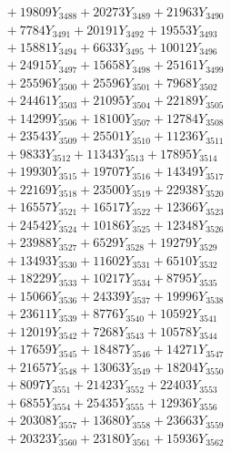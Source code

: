 \documentclass[a4paper,10pt]{article}
\begin{document}
{\begin{align}
&\;  + 19809 Y_{3488} + 20273 Y_{3489} + 21963 Y_{3490} \\[0.3ex]
&\;  + 7784 Y_{3491} + 20191 Y_{3492} + 19553 Y_{3493} \\[0.3ex]
&\;  + 15881 Y_{3494} + 6633 Y_{3495} + 10012 Y_{3496} \\[0.3ex]
&\;  + 24915 Y_{3497} + 15658 Y_{3498} + 25161 Y_{3499} \\[0.3ex]
&\;  + 25596 Y_{3500} + 25596 Y_{3501} + 7968 Y_{3502} \\[0.3ex]
&\;  + 24461 Y_{3503} + 21095 Y_{3504} + 22189 Y_{3505} \\[0.3ex]
&\;  + 14299 Y_{3506} + 18100 Y_{3507} + 12784 Y_{3508} \\[0.5ex]\allowbreak
&\;  + 23543 Y_{3509} + 25501 Y_{3510} + 11236 Y_{3511} \\[0.3ex]
&\;  + 9833 Y_{3512} + 11343 Y_{3513} + 17895 Y_{3514} \\[0.3ex]
&\;  + 19930 Y_{3515} + 19707 Y_{3516} + 14349 Y_{3517} \\[0.3ex]
&\;  + 22169 Y_{3518} + 23500 Y_{3519} + 22938 Y_{3520} \\[0.3ex]
&\;  + 16557 Y_{3521} + 16517 Y_{3522} + 12366 Y_{3523} \\[0.3ex]
&\;  + 24542 Y_{3524} + 10186 Y_{3525} + 12348 Y_{3526} \\[0.3ex]
&\;  + 23988 Y_{3527} + 6529 Y_{3528} + 19279 Y_{3529} \\[0.3ex]
&\;  + 13493 Y_{3530} + 11602 Y_{3531} + 6510 Y_{3532} \\[0.3ex]
&\;  + 18229 Y_{3533} + 10217 Y_{3534} + 8795 Y_{3535} \\[0.3ex]
&\;  + 15066 Y_{3536} + 24339 Y_{3537} + 19996 Y_{3538} \\[0.5ex]\allowbreak
&\;  + 23611 Y_{3539} + 8776 Y_{3540} + 10592 Y_{3541} \\[0.3ex]
&\;  + 12019 Y_{3542} + 7268 Y_{3543} + 10578 Y_{3544} \\[0.3ex]
&\;  + 17659 Y_{3545} + 18487 Y_{3546} + 14271 Y_{3547} \\[0.3ex]
&\;  + 21657 Y_{3548} + 13063 Y_{3549} + 18204 Y_{3550} \\[0.3ex]
&\;  + 8097 Y_{3551} + 21423 Y_{3552} + 22403 Y_{3553} \\[0.3ex]
&\;  + 6855 Y_{3554} + 25435 Y_{3555} + 12936 Y_{3556} \\[0.3ex]
&\;  + 20308 Y_{3557} + 13680 Y_{3558} + 23663 Y_{3559} \\[0.3ex]
&\;  + 20323 Y_{3560} + 23180 Y_{3561} + 15936 Y_{3562} \\[0.3ex]

\end{align}}
\end{document}
